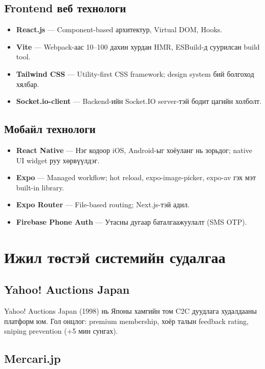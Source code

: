 \documentclass[12pt, a4paper]{report}
\begin{document}
\subsection{Frontend веб технологи}

\begin{itemize}
  \item \textbf{React.js} — Component-based архитектур, Virtual DOM, Hooks.
  \item \textbf{Vite} — Webpack-аас 10--100 дахин хурдан HMR, ESBuild-д суурилсан build tool.
  \item \textbf{Tailwind CSS} — Utility-first CSS framework; design system бий болгоход хялбар.
  \item \textbf{Socket.io-client} — Backend-ийн Socket.IO server-тэй бодит цагийн холболт.
\end{itemize}

\subsection{Мобайл технологи}

\begin{itemize}
  \item \textbf{React Native} — Нэг кодоор iOS, Android-ыг хоёуланг нь зорьдог; native UI widget руу хөрвүүлдэг.
  \item \textbf{Expo} — Managed workflow; hot reload, expo-image-picker, expo-av гэх мэт built-in library.
  \item \textbf{Expo Router} — File-based routing; Next.js-тэй адил.
  \item \textbf{Firebase Phone Auth} — Утасны дугаар баталгаажуулалт (SMS OTP).
\end{itemize}

\section{Ижил төстэй системийн судалгаа}

\subsection{Yahoo! Auctions Japan}

Yahoo! Auctions Japan (1998) нь Японы хамгийн том C2C дуудлага худалдааны платформ юм. Гол онцлог: premium membership, хоёр талын feedback rating, sniping prevention (+5 мин сунгах).

\subsection{Mercari.jp}
\end{document}
